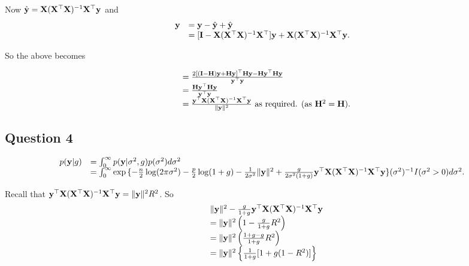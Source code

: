 \documentclass{amsart}[12pt]
\begin{document}
Now $\hat{{\bf y}} = {\bf X} ({\bf X}^\top {\bf X})^{-1} {\bf X}^\top {\bf y}$ and
\begin{equation*}
\begin{array}{ll}
{\bf y} &= {\bf y} - \hat{{\bf y}} + \hat{{\bf y}} \\
&= [{\bf I} - {\bf X} ({\bf X}^\top {\bf X})^{-1} {\bf X}^\top] {\bf y} + {\bf X} ({\bf X}^\top {\bf X})^{-1} {\bf X}^\top {\bf y}.
\end{array}
\end{equation*}

So the above becomes

\begin{equation*}
\begin{array}{ll}
&= \frac{2[({\bf I} - {\bf H}) {\bf y} + {\bf H} {\bf y}]^\top {\bf H} {\bf y} - {\bf H} {\bf y}^\top {\bf H} {\bf y}}{{\bf y}^\top {\bf y}} \\
&= \frac{{\bf H} {\bf y}^\top {\bf H} {\bf y}}{{\bf y}^\top {\bf y}} \\
&= \frac{{\bf y}^\top {\bf X} ({\bf X}^\top {\bf X})^{-1} {\bf X}^\top {\bf y}}{\| {\bf y} \|^2} \text{ as required. } (\text{as } {\bf H}^2 = {\bf H}).
\end{array}
\end{equation*}

\subsection{Question 4}
\begin{equation*}
\begin{array}{ll}
p({\bf y} | g) &= \int_0^\infty p({\bf y} | \sigma^2, g) p(\sigma^2) d \sigma^2 \\
&= \int_0^\infty \exp{\{ -\frac{n}{2} \log (2 \pi \sigma^2) - \frac{p}{2} \log(1 + g)
	 - \frac{1}{2 \sigma^2} \| {\bf y}\|^2
	 + \frac{g}{2 \sigma^2 (1 + g)} {\bf y}^\top {\bf X}({\bf X}^\top {\bf X})^{-1} {\bf X}^\top {\bf y}\}}
	 (\sigma^2)^{-1} I(\sigma^2 > 0) d \sigma^2.
\end{array}
\end{equation*}

Recall that ${\bf y}^\top {\bf X}({\bf X}^\top {\bf X})^{-1} {\bf X}^\top {\bf y} = \| {\bf y} \|^2 R^2$. So
\begin{equation*}
\begin{array}{ll}
& \| {\bf y} \|^2 -\frac{g}{1 + g} {\bf y}^\top {\bf X} ({\bf X}^\top {\bf X})^{-1} {\bf X}^\top {\bf y} \\
&= \| {\bf y} \|^2 \left(1 - \frac{g}{1 + g}R^2 \right) \\
&= \| {\bf y} \|^2 \left(\frac{1 + g - g}{1 + g} R^2 \right) \\
&= \| {\bf y} \|^2 \left\{ \frac{1}{1 + g} [ 1 + g(1 - R^2) ] \right\}
\end{array}
\end{equation*}
\end{document}
